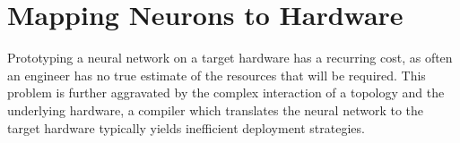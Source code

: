 \chapter{Mapping Neurons to Hardware}\label{ch:mapping}

Prototyping a neural network on a target hardware has a recurring cost, as often an engineer has no true estimate of the resources that will be required. This problem is further aggravated by the complex interaction of a topology and the underlying hardware, a compiler which translates the neural network to the target hardware typically yields inefficient deployment strategies.

